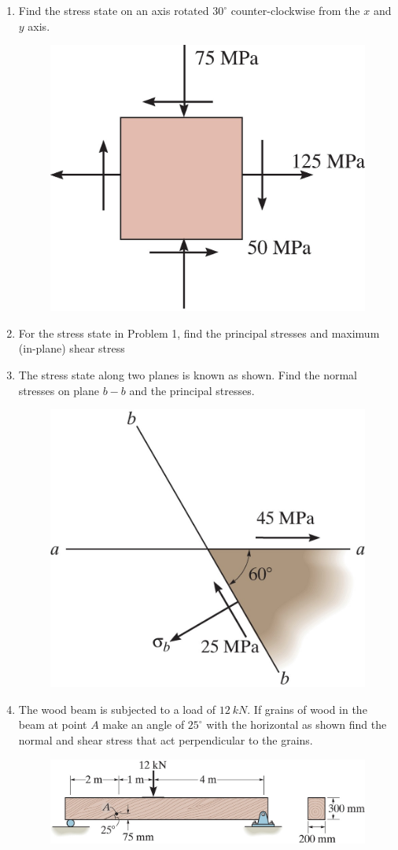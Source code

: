\documentclass[12pt, oneside]{article}
\begin{document}
\begin{enumerate}
	\item %
		Find the stress state on an axis rotated $30^\circ$ counter-clockwise from the $x$ and $y$ axis.
		\begin{figure}[H]
			\centering
			\includegraphics[width=0.6\linewidth]{9-17}
		\end{figure}

	\item For the stress state in Problem 1, find the principal stresses and maximum (in-plane) shear stress
		\newpage

	\item %
		The stress state along two planes is known as shown.
		Find the normal stresses on plane $b-b$ and the principal stresses.
		\begin{figure}[H]
			\centering
			\includegraphics[width=0.6\linewidth]{9-20}
		\end{figure}

	\item %
		The wood beam is subjected to a load of $ 	\SI{12 }{kN}  $.
		If grains of wood in the beam at point $A$ make an angle of $25^\circ$ with the horizontal as shown find the normal and shear stress that act perpendicular to the grains.
		\begin{figure}[H]
			\centering
			\includegraphics[width=0.8\linewidth]{9-24}
		\end{figure}
		\newpage


\end{enumerate}
\end{document}
